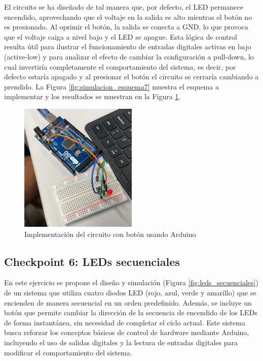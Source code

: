 \documentclass{article}
\begin{document}
El circuito se ha diseñado de tal manera que, por defecto, el LED permanece encendido, aprovechando que el voltaje en la salida es alto mientras el botón no es presionado. Al oprimir el botón, la salida se conecta a GND, lo que provoca que el voltaje caiga a nivel bajo y el LED se apague. Esta lógica de control resulta útil para ilustrar el funcionamiento de entradas digitales activas en bajo (active-low) y para analizar el efecto de cambiar la configuración a pull-down, lo cual invertiría completamente el comportamiento del sistema, es decir, por defecto estaría apagado y al presionar el botón el circuito se cerraría cambiando a prendido. La Figura \ref{fig:simulacion_esquema7} muestra el esquema a implementar y los resultados se muestran en la Figura \ref{fig:simulacion_esquema8}.

\begin{figure}[H]
    \centering
    \includegraphics[width=0.50\textwidth]{./img/ckpt_3_5_1.png}
    \caption{Implementación del circuito con botón usando Arduino}
    \label{fig:simulacion_esquema8}
\end{figure}

\subsection{Checkpoint 6: LEDs secuenciales}

En este ejercicio se propone el dise\~no y simulación (Figura \ref{fig:leds_secuenciales}) de un sistema que utiliza cuatro diodos LED (rojo, azul, verde y amarillo) que se encienden de manera secuencial en un orden predefinido. Adem\'as, se incluye un botón que permite cambiar la dirección de la secuencia de encendido de los LEDs de forma instant\'anea, sin necesidad de completar el ciclo actual. Este sistema busca reforzar los conceptos b\'asicos de control de hardware mediante Arduino, incluyendo el uso de salidas digitales y la lectura de entradas digitales para modificar el comportamiento del sistema.
\end{document}
